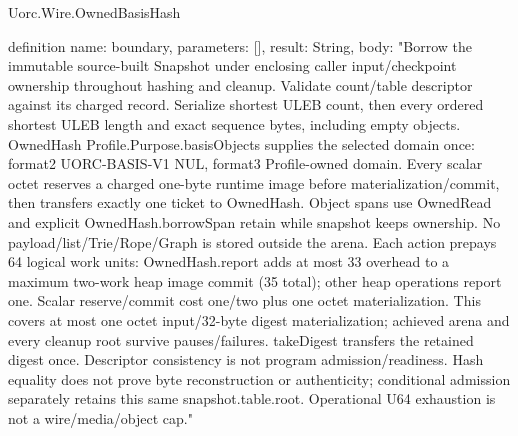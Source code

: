 \begin{lexlean}{Uorc.Wire.OwnedBasisHash}
\begin{semanticmodule}
definition{
  name: boundary,
  parameters: [],
  result: String,
  body: "Borrow the immutable source-built Snapshot under enclosing caller input/checkpoint ownership throughout hashing and cleanup. Validate count/table descriptor against its charged record. Serialize shortest ULEB count, then every ordered shortest ULEB length and exact sequence bytes, including empty objects. OwnedHash Profile.Purpose.basisObjects supplies the selected domain once: format2 UORC-BASIS-V1 NUL, format3 Profile-owned domain. Every scalar octet reserves a charged one-byte runtime image before materialization/commit, then transfers exactly one ticket to OwnedHash. Object spans use OwnedRead and explicit OwnedHash.borrowSpan retain while snapshot keeps ownership. No payload/list/Trie/Rope/Graph is stored outside the arena. Each action prepays 64 logical work units: OwnedHash.report adds at most 33 overhead to a maximum two-work heap image commit (35 total); other heap operations report one. Scalar reserve/commit cost one/two plus one octet materialization. This covers at most one octet input/32-byte digest materialization; achieved arena and every cleanup root survive pauses/failures. takeDigest transfers the retained digest once. Descriptor consistency is not program admission/readiness. Hash equality does not prove byte reconstruction or authenticity; conditional admission separately retains this same snapshot.table.root. Operational U64 exhaustion is not a wire/media/object cap."
}
\end{semanticmodule}
\end{lexlean}
